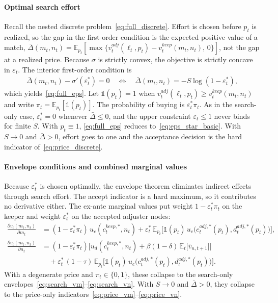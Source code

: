 \paragraph{Optimal search effort}
Recall the nested discrete problem~\eqref{eq:full_discrete}. Effort is chosen before $p_t$ is realized, so the gap in the first-order condition is the expected positive value of a match, $\bar\Delta(m_t,n_t)=\mathbb{E}_{p_t}[\max\{v_t^{adj}(\ell_t,p_t)-v_t^{keep}(m_t,n_t),\,0\}]$, not the gap at a realized price. Because $\sigma$ is strictly convex, the objective is strictly concave in $\varepsilon_t$. The interior first-order condition is
\begin{align}
	\bar\Delta(m_t,n_t) - \sigma'(\varepsilon_t^\ast) = 0
	\quad\Longleftrightarrow\quad
	\bar\Delta(m_t,n_t) = -S\log(1-\varepsilon_t^\ast),
\end{align}
which yields~\eqref{eq:full_eps}. Let $\mathbb{1}(p_t)=1$ when $v_t^{adj}(\ell_t,p_t)\ge v_t^{keep}(m_t,n_t)$ and write $\pi_t=\mathbb{E}_{p_t}[\mathbb{1}(p_t)]$. The probability of buying is $\varepsilon_t^\ast\pi_t$. As in the search-only case, $\varepsilon_t^\ast=0$ whenever $\bar\Delta\le 0$, and the upper constraint $\varepsilon_t\le 1$ never binds for finite $S$. With $p_t\equiv 1$, \eqref{eq:full_eps} reduces to~\eqref{eq:eps_star_basic}. With $S\to 0$ and $\bar\Delta>0$, effort goes to one and the acceptance decision is the hard indicator of~\eqref{eq:price_discrete}.

\paragraph{Envelope conditions and combined marginal values}
Because $\varepsilon_t^\ast$ is chosen optimally, the envelope theorem eliminates indirect effects through search effort. The accept indicator is a hard maximum, so it contributes no derivative either. The ex-ante marginal values put weight $1-\varepsilon_t^\ast\pi_t$ on the keeper and weight $\varepsilon_t^\ast$ on the accepted adjuster nodes:
\begin{align}
	\frac{\partial v_t(m_t,n_t)}{\partial m_t}
	&= (1-\varepsilon_t^\ast\pi_t)\, u_c(c_t^{keep,\ast},n_t)
	+ \varepsilon_t^\ast\, \mathbb{E}_{p_t}\Big[\mathbb{1}(p_t)\, u_c\big(c_t^{adj,\ast}(p_t),d_t^{adj,\ast}(p_t)\big)\Big], \label{eq:full_vm}\\
	\frac{\partial v_t(m_t,n_t)}{\partial n_t}
	&= (1-\varepsilon_t^\ast\pi_t)\Big[u_d(c_t^{keep,\ast},n_t) + \beta(1-\delta)\,\mathbb{E}_t\big[\bar v_{n,t+1}\big]\Big] \nonumber\\
	&\quad + \varepsilon_t^\ast\,(1-\tau)\, \mathbb{E}_{p_t}\Big[\mathbb{1}(p_t)\, u_c\big(c_t^{adj,\ast}(p_t),d_t^{adj,\ast}(p_t)\big)\Big]. \label{eq:full_vn}
\end{align}
With a degenerate price and $\pi_t\in\{0,1\}$, these collapse to the search-only envelopes~\eqref{eq:search_vm}--\eqref{eq:search_vn}. With $S\to 0$ and $\bar\Delta>0$, they collapse to the price-only indicators~\eqref{eq:price_vm}--\eqref{eq:price_vn}.

